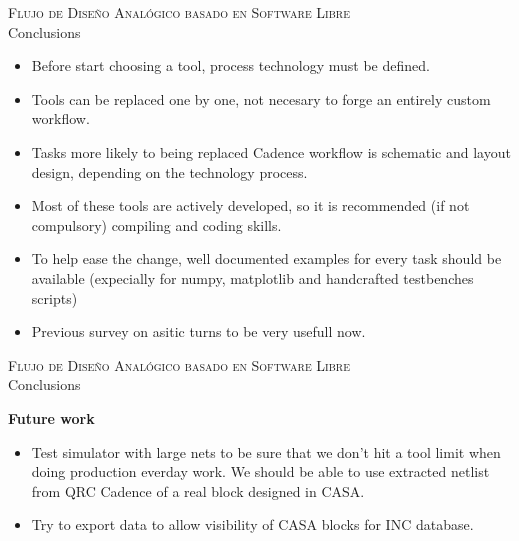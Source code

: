 \documentclass[ps,clariphy]{prosper}
\begin{document}
\begin{slide}{ \textsc{{\tiny Flujo de Dise\~no Anal\'ogico basado en Software Libre}}\\ Conclusions}
  \vspace{-0.5cm}
  \tiny{
\begin{itemize}
\item Before start choosing a tool, process technology must be defined.
\item Tools can be replaced one by one, not necesary to forge an entirely custom workflow.
\item Tasks more likely to being replaced Cadence workflow is schematic and layout design, depending on the technology process.
\item Most of these tools are actively developed, so it is recommended (if not compulsory) compiling and coding skills.
\item To help ease the change, well documented examples for every task should be available (expecially for numpy, matplotlib and handcrafted testbenches scripts)
\item Previous survey on asitic turns to be very usefull now.

 \end{itemize}
  }
\end{slide}





\begin{slide}{ \textsc{{\tiny Flujo de Dise\~no Anal\'ogico basado en Software Libre}}\\ Conclusions}
  \vspace{-0.5cm}
  \tiny{
\textbf{Future work}
\begin{itemize}
\item Test simulator with large nets to be sure that we don't hit a tool limit when doing production everday work. We should be able to use extracted netlist from QRC Cadence of a real block designed in CASA.
\item Try to export data to allow visibility of CASA blocks for INC database.

 \end{itemize}
  }
\end{slide}
\end{document}
